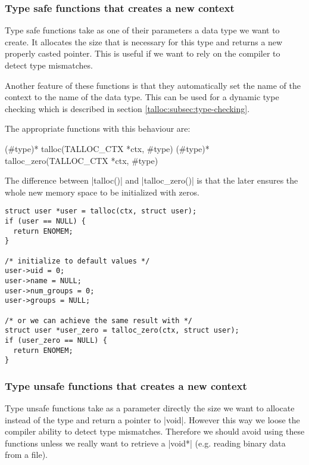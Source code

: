 \subsubsection{Type safe functions that creates a new context}

Type safe functions take as one of their parameters a data type we want to
create. It allocates the size that is necessary for this type and returns a new
properly casted pointer. This is useful if we want to rely on the compiler to
detect type mismatches.

Another feature of these functions is that they automatically set the name of
the context to the name of the data type. This can be used for a dynamic type
checking which is described in section \ref{talloc:subsec:type-checking}.

The appropriate functions with this behaviour are:

\begin{funcproto}
(#type)* talloc(TALLOC_CTX *ctx, #type)
(#type)* talloc_zero(TALLOC_CTX *ctx, #type)
\end{funcproto}
\funclistend
The difference between |talloc()| and |talloc_zero()| is that the later ensures
the whole new memory space to be initialized with zeros.

\begin{lstlisting}[caption={talloc() and talloc_zero()},label=lst:talloc_zero]
struct user *user = talloc(ctx, struct user);
if (user == NULL) {
  return ENOMEM;
}

/* initialize to default values */
user->uid = 0;
user->name = NULL;
user->num_groups = 0;
user->groups = NULL;

/* or we can achieve the same result with */
struct user *user_zero = talloc_zero(ctx, struct user);
if (user_zero == NULL) {
  return ENOMEM;
}
\end{lstlisting}

\subsubsection{Type unsafe functions that creates a new context}

Type unsafe functions take as a parameter directly the size we want to
allocate instead of the type and return a pointer to |void|. However this way
we loose the compiler ability to detect type mismatches. Therefore we should
avoid using these functions unless we really want to retrieve a |void*| (e.g.
reading binary data from a file).

